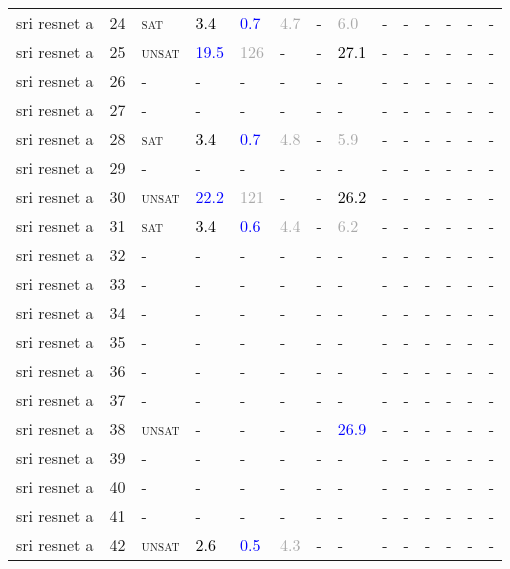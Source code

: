 \begin{center}
{\begin{longtable}{@{}llllllllllllll@{}}
sri resnet a & 24 & \textsc{sat} & \textcolor{black}{3.4} & \textcolor{blue}{0.7} & \textcolor{darkgray}{4.7} & - & \textcolor{darkgray}{6.0} & - & - & - & - & - & - \\
sri resnet a & 25 & \textsc{unsat} & \textcolor{blue}{19.5} & \textcolor{darkgray}{126} & - & - & \textcolor{black}{27.1} & - & - & - & - & - & - \\
sri resnet a & 26 & - & - & - & - & - & - & - & - & - & - & - & - \\
sri resnet a & 27 & - & - & - & - & - & - & - & - & - & - & - & - \\
sri resnet a & 28 & \textsc{sat} & \textcolor{black}{3.4} & \textcolor{blue}{0.7} & \textcolor{darkgray}{4.8} & - & \textcolor{darkgray}{5.9} & - & - & - & - & - & - \\
sri resnet a & 29 & - & - & - & - & - & - & - & - & - & - & - & - \\
sri resnet a & 30 & \textsc{unsat} & \textcolor{blue}{22.2} & \textcolor{darkgray}{121} & - & - & \textcolor{black}{26.2} & - & - & - & - & - & - \\
sri resnet a & 31 & \textsc{sat} & \textcolor{black}{3.4} & \textcolor{blue}{0.6} & \textcolor{darkgray}{4.4} & - & \textcolor{darkgray}{6.2} & - & - & - & - & - & - \\
sri resnet a & 32 & - & - & - & - & - & - & - & - & - & - & - & - \\
sri resnet a & 33 & - & - & - & - & - & - & - & - & - & - & - & - \\
sri resnet a & 34 & - & - & - & - & - & - & - & - & - & - & - & - \\
sri resnet a & 35 & - & - & - & - & - & - & - & - & - & - & - & - \\
sri resnet a & 36 & - & - & - & - & - & - & - & - & - & - & - & - \\
sri resnet a & 37 & - & - & - & - & - & - & - & - & - & - & - & - \\
sri resnet a & 38 & \textsc{unsat} & - & - & - & - & \textcolor{blue}{26.9} & - & - & - & - & - & - \\
sri resnet a & 39 & - & - & - & - & - & - & - & - & - & - & - & - \\
sri resnet a & 40 & - & - & - & - & - & - & - & - & - & - & - & - \\
sri resnet a & 41 & - & - & - & - & - & - & - & - & - & - & - & - \\
sri resnet a & 42 & \textsc{unsat} & \textcolor{black}{2.6} & \textcolor{blue}{0.5} & \textcolor{darkgray}{4.3} & - & - & - & - & - & - & - & - \\

\end{longtable}}
\end{center}
